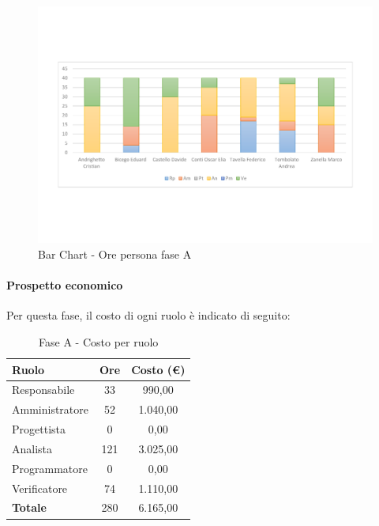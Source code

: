 \documentclass[../PianoProgetto.tex]{subfiles}
\begin{document}
	\begin{figure}[!h]
		\centering
		\includegraphics[width=\textwidth , trim=2cm 5cm 2cm 5cm]{grafici/A/A-ore-persona}
			\caption{Bar Chart - Ore persona fase A}
		\label{fig:BarChart-faseA_ore}
	\end{figure}	
	
\newpage
	\vfill	
	\paragraph{Prospetto economico}
					Per questa fase, il costo di ogni ruolo è indicato di seguito:
	
	\begin{table}[h]
		\centering
		\begin{tabular}{l * {2}{c}}
			\toprule
			\textbf{Ruolo} & \textbf{Ore} & \textbf{Costo (\euro{})} \\
			\midrule
			Responsabile &	33 &  990,00 \\
			Amministratore & 52 &  1.040,00 \\
			Progettista & 0 & 0,00 \\
			Analista & 121 & 3.025,00 \\
			Programmatore & 0 & 0,00 \\
			Verificatore & 74 & 1.110,00 \\
			\midrule		
			\textbf{Totale} & 280 & 6.165,00 \\
			\bottomrule	
		\end{tabular}
		\caption{Fase A - Costo per ruolo}
		\label{tab:faseA_costo}
	\end{table}
\end{document}
